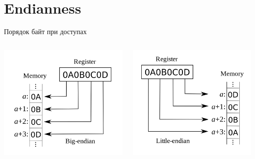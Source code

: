 \documentclass{beamer}
\begin{document}
\section{Endianness}

\begin{frame}{Порядок байт при доступах}

\begin{columns}[onlytextwidth]
\begin{column}{0.5\textwidth}
\includegraphics[width=\textwidth]{./be}
\end{column}

\begin{column}{0.5\textwidth}
\includegraphics[width=\textwidth]{./le}
\end{column}
\end{columns}


\end{frame}
\end{document}
